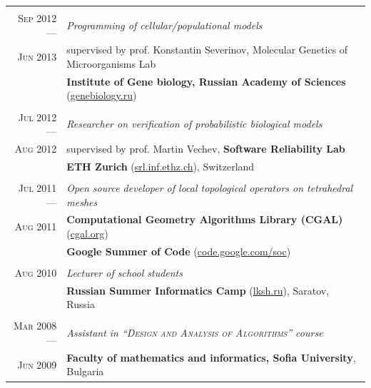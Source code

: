 \documentclass[a4paper,10pt]{article}
\def\myline{\color{linegray}\vline}
\begin{document}
{\begin{tabular}{r!{\myline}p{14cm}}
        \\
	\textsc{Sep 2012 ---}      &  \textit{Programming of cellular/populational models}\\
        \textsc{Jun 2013}  &  supervised by prof. Konstantin Severinov, Molecular Genetics of Microorganisms Lab\\
                                  &  \textbf{Institute of Gene biology, Russian Academy of Sciences} (\href{http://www.genebiology.ru/}{genebiology.ru})\\
	
        \\
	\textsc{Jul 2012 ---}      &  \textit{Researcher on verification of probabilistic biological models}\\
        \textsc{Aug 2012} &  supervised by prof. Martin Vechev, \textbf{Software Reliability Lab}\\
                                  &  \textbf{ETH Zurich} (\href{http://www.srl.inf.ethz.ch/}{srl.inf.ethz.ch}), Switzerland\\
	
        \\
	\textsc{Jul 2011 ---}      &  \textit{Open source developer of local topological operators on tetrahedral meshes}\\
	\textsc{Aug 2011}         &  \textbf{Computational Geometry Algorithms Library (CGAL)} (\href{http://www.cgal.org/}{cgal.org})\\
                                  &  \textbf{Google Summer of Code} (\href{http://code.google.com/soc/}{code.google.com/soc})\\
	
        \\
	\textsc{Aug 2010}         &  \textit{Lecturer of school students}\\
	                          &  \textbf{Russian Summer Informatics Camp} (\href{http://lksh.ru/}{lksh.ru}), Saratov, Russia\vspace{-5mm}\\
	
	\\
	\textsc{Mar 2008 ---}      &  \textit{Assistant in \textsc{``Design and Analysis of Algorithms''} course}\\
	\textsc{Jun 2009}        &  \textbf{Faculty of mathematics and informatics, Sofia University}, Bulgaria\\


\end{tabular}}
\end{document}
